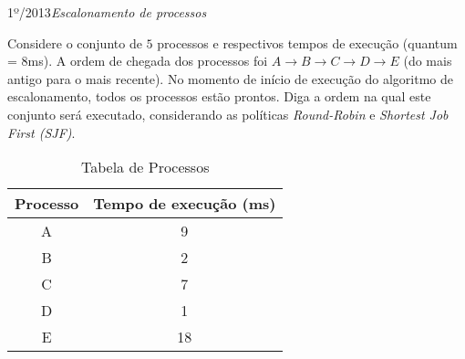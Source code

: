 \begin{exercicio}
  {1º/2013}{\textit{Escalonamento de processos}}
  {Considere o conjunto de $5$ processos e respectivos tempos de execução (quantum = $8$ms). A ordem de chegada dos processos foi $A \rightarrow B \rightarrow C \rightarrow D \rightarrow E$ (do mais antigo para o mais recente). No momento de início de execução do algoritmo de escalonamento, todos os processos estão prontos. Diga a ordem na qual este conjunto será executado, considerando as políticas \textit{Round-Robin} e \textit{Shortest Job First (SJF)}.
  \begin{table}[H]
    \centering
    \begin{tabular}{cc}
      \hline \hline
      \textbf{Processo} & \textbf{Tempo de execução (ms)} \\ \hline
      A                 & 9                               \\
      B                 & 2                              \\
      C                 & 7                               \\
      D                 & 1                               \\
      E                 & 18                              \\ \hline \hline
    \end{tabular}
    \caption{Tabela de Processos}
    \label{tab:ex3}
  \end{table}
  }
\end{exercicio}

